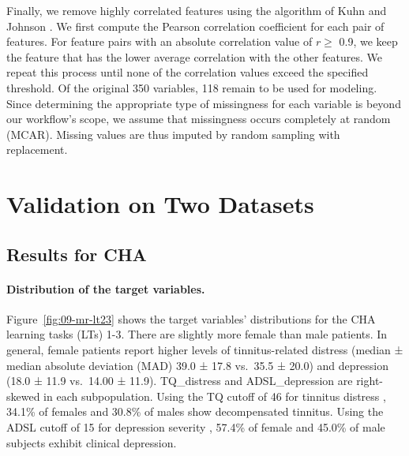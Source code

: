\documentclass[
  oneside]{book}
\begin{document}
Finally, we remove highly correlated features using the algorithm of Kuhn and Johnson \autocite{kuhn2013applied}.
We first compute the Pearson correlation coefficient for each pair of features.
For feature pairs with an absolute correlation value of \(r \geq\) 0.9, we keep the feature that has the lower average correlation with the other features.
We repeat this process until none of the correlation values exceed the specified threshold.
Of the original 350 variables, 118 remain to be used for modeling.
Since determining the appropriate type of missingness for each variable is beyond our workflow's scope, we assume that missingness occurs completely at random (MCAR).
Missing values are thus imputed by random sampling with replacement.

\hypertarget{gender-results}{%
\section{Validation on Two Datasets}\label{gender-results}}

\hypertarget{results-for-cha}{%
\subsection{Results for CHA}\label{results-for-cha}}

\paragraph*{Distribution of the target variables.}

Figure~\ref{fig:09-mr-lt23} shows the target variables' distributions for the CHA learning tasks (LTs) 1-3.
There are slightly more female than male patients.
In general, female patients report higher levels of tinnitus-related distress (median ± median absolute deviation (MAD) 39.0 ± 17.8 vs.~35.5 ± 20.0) and depression (18.0 ± 11.9 vs.~14.00 ± 11.9).
TQ\_distress and ADSL\_depression are right-skewed in each subpopulation.
Using the TQ cutoff of 46 for tinnitus distress \autocite{GoebelHiller:TF1998}, 34.1\% of females and 30.8\% of males show decompensated tinnitus.
Using the ADSL cutoff of 15 for depression severity \autocite{Hautzinger:ADSL2003}, 57.4\% of female and 45.0\% of male subjects exhibit clinical depression.
\end{document}
